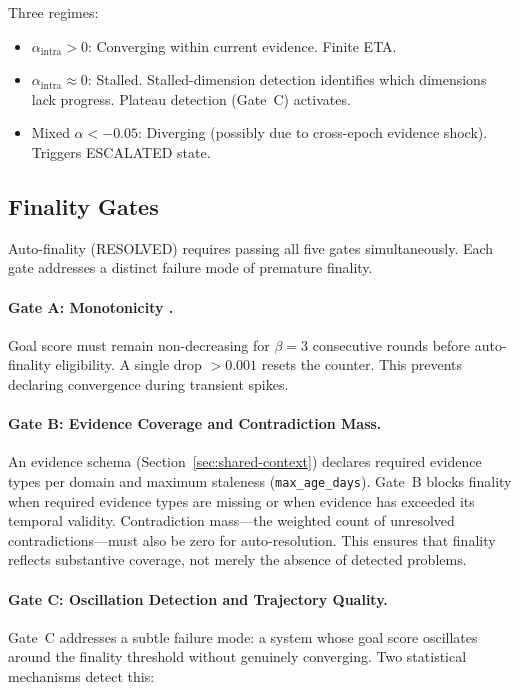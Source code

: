 \documentclass[11pt]{article}
\begin{document}
Three regimes:
\begin{itemize}
  \item $\alpha_{\text{intra}} > 0$: Converging within current evidence. Finite ETA.
  \item $\alpha_{\text{intra}} \approx 0$: Stalled. Stalled-dimension detection identifies which dimensions lack progress. Plateau detection (Gate~C) activates.
  \item Mixed $\alpha < -0.05$: Diverging (possibly due to cross-epoch evidence shock). Triggers ESCALATED state.
\end{itemize}

\subsection{Finality Gates}
\label{sec:finality-gates}

Auto-finality (RESOLVED) requires passing all five gates simultaneously. Each gate addresses a distinct failure mode of premature finality.

\paragraph{Gate A: Monotonicity \cite{ruan2025}.}
Goal score must remain non-decreasing for $\beta = 3$ consecutive rounds before auto-finality eligibility. A single drop $> 0.001$ resets the counter. This prevents declaring convergence during transient spikes.

\paragraph{Gate B: Evidence Coverage and Contradiction Mass.}
An evidence schema (Section~\ref{sec:shared-context}) declares required evidence types per domain and maximum staleness (\texttt{max\_age\_days}). Gate~B blocks finality when required evidence types are missing or when evidence has exceeded its temporal validity. Contradiction mass---the weighted count of unresolved contradictions---must also be zero for auto-resolution. This ensures that finality reflects substantive coverage, not merely the absence of detected problems.

\paragraph{Gate C: Oscillation Detection and Trajectory Quality.}
Gate~C addresses a subtle failure mode: a system whose goal score oscillates around the finality threshold without genuinely converging. Two statistical mechanisms detect this:
\end{document}
